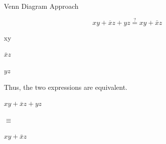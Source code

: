 \documentclass[12pt,openany]{book}
\begin{document}
			      	Venn Diagram Approach
			      	
			      	\[
			      		xy + \overline{x}z + yz \stackrel{?}{=} xy + \bar{x}z
			      	\]
			      	
			      	
			      	\noindent %
			      	\begin{minipage}{.33\textwidth}
			      		\centering %
			      		\begin{venndiagram3sets}[labelA=\(x\), labelB=\(y\), labelC=\(z\)]
			      			\fillACapB
			      		\end{venndiagram3sets}
			      		xy %
			      	\end{minipage}%
			      	\begin{minipage}{.33\textwidth}
			      		\centering
			      		\begin{venndiagram3sets}[labelA=\(x\), labelB=\(y\), labelC=\(z\)]
			      			\fillCNotA
			      		\end{venndiagram3sets}
			      		$\bar{x}z$
			      	\end{minipage}%
			      	\begin{minipage}{.33\textwidth}
			      		\centering
			      		\begin{venndiagram3sets}[labelA=\(x\), labelB=\(y\), labelC=\(z\)]
			      			\fillBCapC
			      		\end{venndiagram3sets}
			      		$yz$
			      	\end{minipage}
			      	
			      	\vspace{10px}
			      	Thus, the two expressions are equivalent. \newline \vspace*{20px}
			      	\noindent %
			      	\begin{minipage}[c]{0.30\textwidth} %
			      		\centering %
			      		\begin{venndiagram3sets}[labelA=\(x\), labelB=\(y\), labelC=\(z\)]
			      			\fillACapB
			      			\fillOnlyC
			      			\fillBCapC
			      		\end{venndiagram3sets}
			      		$ xy + \overline{x}z + yz $
			      	\end{minipage}%
			      	\hfill %
			      	{\large $\equiv$} %
			      	\hfill %
			      	\begin{minipage}[c]{0.45\textwidth} %
			      		\centering %
			      		\begin{venndiagram3sets}[labelA=\(x\), labelB=\(y\), labelC=\(z\)]
			      			\fillACapB
			      			\fillOnlyC
			      			\fillBCapC
			      		\end{venndiagram3sets}
			      		$ xy + \bar{x}z$
			      	\end{minipage}
			      	\hspace*{100px}
			      	
\end{document}
